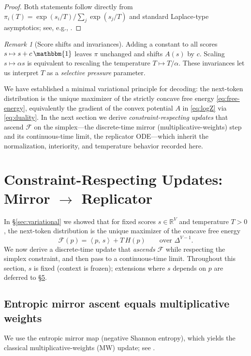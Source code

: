 \documentclass[10pt,a4paper]{amsart}
\numberwithin{equation}{section}
\theoremstyle{plain}
\theoremstyle{definition}
\theoremstyle{remark}
\newtheorem{remark}[theorem]{Remark}
\newcommand{\R}{\mathbb{R}}
\newcommand{\1}{\mathbbm{1}}
\newcommand{\ip}[2]{\left\langle #1,\, #2 \right\rangle}
\newcommand{\Hent}{H}
\newcommand{\simplex}{\Delta^{V-1}}
\begin{document}
\begin{proof}
Both statements follow directly from $\pi_i(T)=\exp(s_i/T)/\sum_j\exp(s_j/T)$ and standard Laplace-type asymptotics; see, e.g., \citet[§12]{cover2006elements}.
\end{proof}

\begin{remark}[Score shifts and invariances]\label{rem:invariance}
Adding a constant to all scores $s\mapsto s+c\,\1$ leaves $\pi$ unchanged and shifts $A(s)$ by $c$. Scaling $s\mapsto \alpha s$ is equivalent to rescaling the temperature $T\mapsto T/\alpha$. These invariances let us interpret $T$ as a \emph{selective pressure} parameter.
\end{remark}


We have established a minimal variational principle for decoding: the next-token distribution is the unique maximizer of the strictly concave free energy \eqref{eq:free-energy}, equivalently the gradient of the convex potential $A$ in \eqref{eq:logZ} via \eqref{eq:duality}. In the next section we derive \emph{constraint-respecting updates} that ascend $\mathcal{F}$ on the simplex—the discrete-time mirror (multiplicative-weights) step and its continuous-time limit, the replicator ODE—which inherit the normalization, interiority, and temperature behavior recorded here.



\section{Constraint-Respecting Updates: Mirror $\rightarrow$ Replicator}\label{sec:mirror}

In \S\ref{sec:variational} we showed that for fixed scores $s\in\R^V$ and temperature $T>0$, the next-token distribution is the unique maximizer of the concave free energy
\[
\mathcal{F}(p)=\ip{p}{s}+T\,\Hent(p)\qquad \text{over }\simplex.
\]
We now derive a discrete-time update that \emph{ascends} $\mathcal{F}$ while respecting the simplex constraint, and then pass to a continuous-time limit. Throughout this section, $s$ is fixed (context is frozen); extensions where $s$ depends on $p$ are deferred to \S\href{https://arxiv.org/abs/2508.21186v1}{5}.

\subsection{Entropic mirror ascent equals multiplicative weights}
We use the entropic mirror map (negative Shannon entropy), which yields the classical multiplicative-weights (MW) update; see \citet{beck2003mirror,arora2012multiplicative,raginsky2012mirror}.
\end{document}
